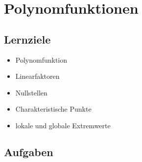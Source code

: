 
\section{Polynomfunktionen}

\subsection*{Lernziele}

\begin{itemize}
\item Polynomfunktion
\item Linearfaktoren
\item Nullstellen
\item Charakteristische Punkte
\item lokale und globale Extremwerte
\end{itemize}

\subsection*{Aufgaben}


\newpage
